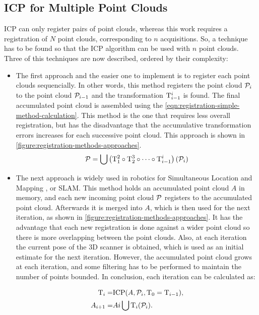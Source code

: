 \subsection{ICP for Multiple Point Clouds}
\label{section:multiple-pointcloud-icp}

ICP can only register pairs of point clouds, whereas this work requires a registration of $N$ point clouds, corresponding to $n$ acquisitions. So, a technique has to be found so that the ICP algorithm can be used with $n$ point clouds. Three of this techniques are now described, ordered by their complexity:

\begin{itemize}
    \item The first approach and the easier one to implement is to register each point clouds sequencially. In other words, this method registers the point cloud $\mathcal{P}_i$ to the point cloud $\mathcal{P}_{i-1}$ and the transformation $\mathrm{T}_{i-1}^{i}$ is found. The final accumulated point cloud is assembled using the \cref{eqn:registration-simple-method-calculation}. This method is the one that requires less overall registration, but has the disadvantage that the accumulative transformation errors increases for each successive point cloud. This approach is shown in \cref{figure:registration-methods-approaches}.
    \begin{equation}
        \label{eqn:registration-simple-method-calculation}
            \mathcal{P} = \bigcup{\left(\mathrm{T}_1^2 \circ \mathrm{T}_2^3 \circ \dots \circ \mathrm{T}_{i-1}^i\right)(\mathcal{P}_i)}
    \end{equation}

    \item The next approach is widely used in robotics for Simultaneous Location and Mapping , or SLAM. This method holds an accumulated point cloud $A$ in memory, and each new incoming point cloud $\mathcal{P}$ registers to the accumulated point cloud.  Afterwards it is merged into $A$, which is then used for the next iteration, as shown in \cref{figure:registration-methods-approaches}. It has the advantage that each new registration is done against a wider point cloud so there is more overlapping between the point clouds. Also, at each iteration the current pose of the 3D scanner is obtained, which is used as an initial estimate for the next iteration. However, the accumulated point cloud grows at each iteration, and some filtering has to be performed to maintain the number of points bounded. In conclusion, each iteration can be calculated as:
    
    \begin{align}
        \label{eqn:icp-compose-1}
        \mathrm{T}_{i} = & \textrm{ICP}(A, \mathcal{P}_{i}, \mathrm{T}_0 = \mathrm{T}_{i-1}), \\
        \label{eqn:icp-compose-2}
        A_{i+1} = & A{i} \bigcup \mathrm{T}_{i}(\mathcal{P}_i).
    \end{align}


\end{itemize}
